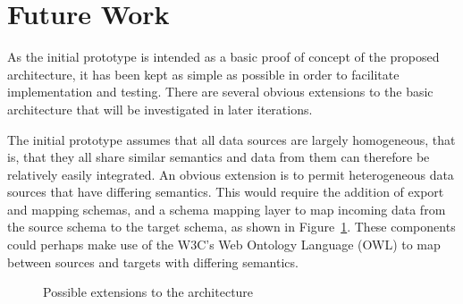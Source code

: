 \documentclass{CRPITStyle}
\begin{document}
\section{Future Work}
\label{sec-future-work}

As the initial prototype is intended as a basic proof of concept of the
proposed architecture, it has been kept as simple as possible in order
to facilitate implementation and testing. There are several obvious
extensions to the basic architecture that will be investigated in later
iterations.

The initial prototype assumes that all data sources are largely
homogeneous, that is, that they all share similar semantics and data
from them can therefore be relatively easily integrated. An obvious
extension is to permit heterogeneous data sources that have differing
semantics. This would require the addition of export and mapping
schemas, and a schema mapping layer to map incoming data from the source
schema to the target schema, as shown in Figure~\ref{fig-extended}.
These components could perhaps make use of the W3C's Web Ontology
Language (OWL) \cite{McGu-DL-2004-OWL} to map between sources and
targets with differing semantics.


\begin{figure}[htb]
	\caption{Possible extensions to the architecture}
	\label{fig-extended}
\end{figure}
\end{document}
